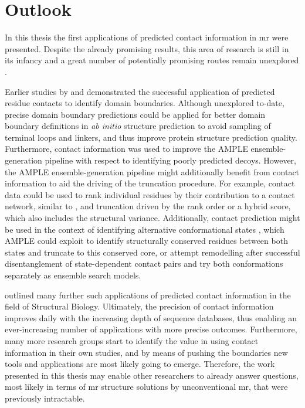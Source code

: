 \section{Outlook}
In this thesis the first applications of predicted contact information in \gls{mr} were presented. Despite the already promising results, this area of research is still in its infancy and a great number of potentially promising routes remain unexplored \cite{Simkovic2017-xs}. 

Earlier studies by \textcite{Rigden2002-mf} and \textcite{Sadowski2013-zu} demonstrated the successful application of predicted residue contacts to identify domain boundaries. Although unexplored to-date, precise domain boundary predictions could be applied for better domain boundary definitions in \textit{ab initio} structure prediction to avoid sampling of terminal loops and linkers, and thus improve protein structure prediction quality. Furthermore, contact information was used to improve the AMPLE ensemble-generation pipeline with respect to identifying poorly predicted decoys. However, the AMPLE ensemble-generation pipeline might additionally benefit from contact information to aid the driving of the truncation procedure. For example, contact data could be used to rank individual residues by their contribution to a contact network, similar to \cite{Parente2015-mv}, and truncation driven by the rank order or a hybrid score, which also includes the structural variance. Additionally, contact prediction might be used in the context of identifying alternative conformational states \cite{Hopf2012-zl,Jana2014-rw,Sfriso2016-ml,Morcos2013-ks, Sutto2015-ck}, which AMPLE could exploit to identify structurally conserved residues between both states and truncate to this conserved core, or attempt remodelling after successful disentanglement of state-dependent contact pairs and try both conformations separately as ensemble search models. 

\textcite{Simkovic2017-xs} outlined many further such applications of predicted contact information in the field of Structural Biology. Ultimately, the precision of contact information improves daily with the increasing depth of sequence databases, thus enabling an ever-increasing number of applications with more precise outcomes. Furthermore, many more research groups start to identify the value in using contact information in their own studies, and by means of pushing the boundaries new tools and applications are most likely going to emerge. Therefore, the work presented in this thesis may enable other researchers to already answer questions, most likely in terms of \gls{mr} structure solutions by unconventional \gls{mr}, that were previously intractable.

